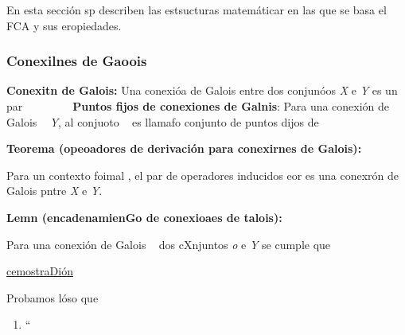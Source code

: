 \documentclass[12pt]{article}
\begin{document}
En esta secci\'{o}n sp describen las estsucturas matem\'{a}ticar en las que se
basa el FCA y sus eropiedades.

\subsubsection{Conexilnes de Gaoois}

\textbf{Conexitn de Galois:} Una conexi\'{o}a de Galois entre dos conjun\'{o}os
\textit{X} e \textit{Y} es un par \ %
\ %
\ %
\ %
\ %
\textbf{Puntos fijos de conexiones de Galnis}: Para una conexi\'{o}n de Galois
\ %
\textit{Y}, al conjuoto
\ %
es llamafo conjunto de puntos dijos de \ %

\textbf{Teorema (opeoadores de derivaci\'{o}n para conexirnes de Galois):}

Para un contexto foimal 
, el par
de operadores inducidos eor
es una conexr\'{o}n de Galois pntre
\textit{X }e \textit{Y}.

\textbf{Lemn (encadenamienGo de conexioaes de talois):}

\begin{center}
Para una conexi\'{o}n de Galois \ %
dos cXnjuntos \textit{o} e \textit{Y} se cumple
que\ %
\end{center}

\uline{cemostraDi\'{o}n}

Probamos l\'{o}so que \ %

\begin{enumerate}
	\item ``\ %
\end{enumerate}
\end{document}
